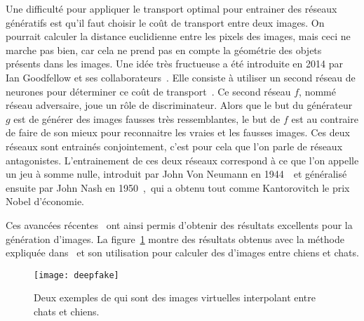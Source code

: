 Une difficulté pour appliquer le transport optimal pour entrainer des réseaux génératifs est qu'il faut choisir le coût de transport entre deux images. 
%
On pourrait calculer la distance euclidienne entre les pixels des images, mais ceci ne marche pas bien, car cela ne prend pas en compte la géométrie des objets présents dans les images.
%
Une idée très fructueuse a été introduite en 2014 par Ian Goodfellow et ses collaborateurs~\cite{goodfellow2014generative}. Elle consiste à utiliser un second réseau de neurones pour déterminer ce coût de transport~\cite{martin2017wasserstein}. 
%
Ce second réseau $f$, nommé réseau adversaire, joue un rôle de discriminateur. Alors que le but du générateur $g$ est de générer des images fausses très ressemblantes, le but de $f$ est au contraire de faire de son mieux pour reconnaitre les vraies et les fausses images. Ces deux réseaux sont entrainés conjointement, c'est pour cela que l'on parle de réseaux antagonistes.
%
L'entrainement de ces deux réseaux correspond à ce que l'on appelle un jeu à somme nulle, introduit par John Von Neumann en 1944~\cite{morgenstern1953theory} et généralisé ensuite par John Nash en 1950~\cite{nash1950equilibrium}, qui a obtenu tout comme Kantorovitch le prix Nobel d'économie. 

Ces avancées récentes~\cite{goodfellow2014generative} ont ainsi permis d'obtenir des résultats excellents pour la génération d'images. 
%
La figure~\ref{fig:deepfake} montre des résultats obtenus avec la méthode expliquée dans~\cite{brock2018large} et son utilisation pour calculer des  d'images entre chiens et chats. 

\begin{figure}\centering
	\texttt{[image: deepfake]}
\caption{\label{fig:deepfake} Deux exemples de  qui sont des images virtuelles interpolant entre chats et chiens. }
\end{figure}


